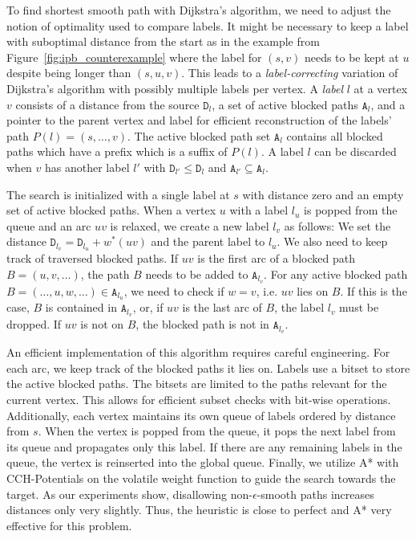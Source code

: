 \documentclass[a4paper,UKenglish,cleveref, autoref, thm-restate]{lipics-v2021}
\begin{document}
To find shortest smooth path with Dijkstra's algorithm, we need to adjust the notion of optimality used to compare labels.
It might be necessary to keep a label with suboptimal distance from the start as in the example from Figure~\ref{fig:ipb_counterexample} where the label for $(s,v)$ needs to be kept at $u$ despite being longer than $(s,u,v)$.
This leads to a \emph{label-correcting} variation of Dijkstra's algorithm with possibly multiple labels per vertex.
A \emph{label} $l$ at a vertex $v$ consists of a distance from the source $\mathtt{D}_l$, a set of active blocked paths $\mathtt{A}_l$, and a pointer to the parent vertex and label for efficient reconstruction of the labels' path $P(l) = (s,\dots,v)$.
The active blocked path set $\mathtt{A}_l$ contains all blocked paths which have a prefix which is a suffix of $P(l)$.
A label $l$ can be discarded when $v$ has another label $l'$ with $\mathtt{D}_{l'} \leq \mathtt{D}_l$ and $\mathtt{A}_{l'} \subseteq \mathtt{A}_l$.

The search is initialized with a single label at $s$ with distance zero and an empty set of active blocked paths.
When a vertex $u$ with a label $l_u$ is popped from the queue and an arc $uv$ is relaxed, we create a new label $l_v$ as follows:
We set the distance $\mathtt{D}_{l_v} = \mathtt{D}_{l_u} + w^*(uv)$ and the parent label to $l_u$.
We also need to keep track of traversed blocked paths.
If $uv$ is the first arc of a blocked path $B = (u,v,\dots)$, the path $B$ needs to be added to $\mathtt{A}_{l_v}$.
For any active blocked path $B = (\dots, u, w, \dots) \in \mathtt{A}_{l_u}$, we need to check if $w=v$, i.e. $uv$ lies on $B$.
If this is the case, $B$ is contained in $\mathtt{A}_{l_v}$, or, if $uv$ is the last arc of $B$, the label $l_v$ must be dropped.
If $uv$ is not on $B$, the blocked path is not in $\mathtt{A}_{l_v}$.

An efficient implementation of this algorithm requires careful engineering.
For each arc, we keep track of the blocked paths it lies on.
Labels use a bitset to store the active blocked paths.
The bitsets are limited to the paths relevant for the current vertex.
This allows for efficient subset checks with bit-wise operations.
Additionally, each vertex maintains its own queue of labels ordered by distance from $s$.
When the vertex is popped from the queue, it pops the next label from its queue and propagates only this label.
If there are any remaining labels in the queue, the vertex is reinserted into the global queue.
Finally, we utilize A* with CCH-Potentials on the volatile weight function to guide the search towards the target.
As our experiments show, disallowing non-$\epsilon$-smooth paths increases distances only very slightly.
Thus, the heuristic is close to perfect and A* very effective for this problem.
\end{document}
